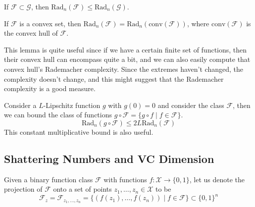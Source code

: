   \begin{lemma}
    If $\mathcal{F} \subset \mathcal{G}$, then $\mathrm{Rad}_n (\mathcal{F}) \leq \mathrm{Rad}_n (\mathcal{G})$.
  \end{lemma}

  \begin{lemma}
    If $\mathcal{F}$ is a convex set, then $\mathrm{Rad}_n (\mathcal{F}) = \mathrm{Rad}_n (\mathrm{conv}(\mathcal{F}))$, where $\mathrm{conv}(\mathcal{F})$ is the convex hull of $\mathcal{F}$.
  \end{lemma}

  This lemma is quite useful since if we have a certain finite set of functions, then their convex hull can encompass quite a bit, and we can also easily compute that convex hull's Rademacher complexity. Since the extremes haven't changed, the complexity doesn't change, and this might suggest that the Rademacher complexity is a good measure. 

  \begin{lemma}
    Consider a $L$-Lipschitz function $g$  with $g(0) = 0$ and consider the class $\mathcal{F}$, then we can bound the class of functions $g \circ \mathcal{F} = \{ g \circ f \mid f \in \mathcal{F} \}$. 
    \begin{equation}
      \mathrm{Rad}_n (g \circ \mathcal{F}) \leq 2 L \mathrm{Rad}_n (\mathcal{F})
    \end{equation}
    This constant multiplicative bound is also useful. 
  \end{lemma}

\subsection{Shattering Numbers and VC Dimension}

  \begin{definition}
    Given a binary function class $\mathcal{F}$ with functions $f: \mathcal{X} \rightarrow \{0, 1\}$, let us denote the projection of $\mathcal{F}$ onto a set of points $z_1, \ldots, z_n \in \mathcal{X}$ to be 
    \begin{equation}
      \mathcal{F}_z = \mathcal{F}_{z_1, \ldots, z_n} = \{ (f(z_1), \ldots, f(z_n)) \mid f \in \mathcal{F} \} \subset \{0, 1\}^n
    \end{equation}
  \end{definition}

